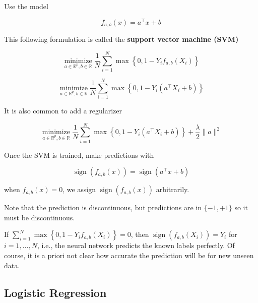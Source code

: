 \documentclass{report}
\begin{document}
\begin{definition}
    Use the model

    $$
    f_{a, b}(x)=a^{\top} x+b
    $$

    This following formulation is called the \textbf{support vector machine (SVM)}

    $$
    \underset{a \in \mathbb{R}^{p}, b \in \mathbb{R}}{\operatorname{minimize}} \frac{1}{N} \sum_{i=1}^{N} \max \left\{0,1-Y_{i} f_{a, b}\left(X_{i}\right)\right\}
    $$

    $$
    \underset{a \in \mathbb{R}^{p}, b \in \mathbb{R}}{\operatorname{minimize}} \frac{1}{N} \sum_{i=1}^{N} \max \left\{0,1-Y_{i}\left(a^{\top} X_{i}+b\right)\right\}
    $$

    It is also common to add a regularizer

    $$
    \underset{a \in \mathbb{R}^{p}, b \in \mathbb{R}}{\operatorname{minimize}} \frac{1}{N} \sum_{i=1}^{N} \max \left\{0,1-Y_{i}\left(a^{\top} X_{i}+b\right)\right\}+\frac{\lambda}{2}\|a\|^{2}
    $$
\end{definition}

\begin{concept}
    Once the SVM is trained, make predictions with

    $$
    \operatorname{sign}\left(f_{a, b}(x)\right)=\operatorname{sign}\left(a^{\top} x+b\right)
    $$

    when $f_{a, b}(x)=0$, we assign $\operatorname{sign}\left(f_{a, b}(x)\right)$ arbitrarily.

    Note that the prediction is discontinuous, but predictions are in $\{-1,+1\}$ so it must be discontinuous.

    If $\sum_{i=1}^{N} \max \left\{0,1-Y_{i} f_{a, b}\left(X_{i}\right)\right\}=0$, then $\operatorname{sign}\left(f_{a, b}\left(X_{i}\right)\right)=Y_{i}$ for $i=1, \ldots, N$, i.e., the neural network predicts the known labels perfectly.
    Of course, it is a priori not clear how accurate the prediction will be for new unseen data.
\end{concept}

\subsection{Logistic Regression}
\end{document}
